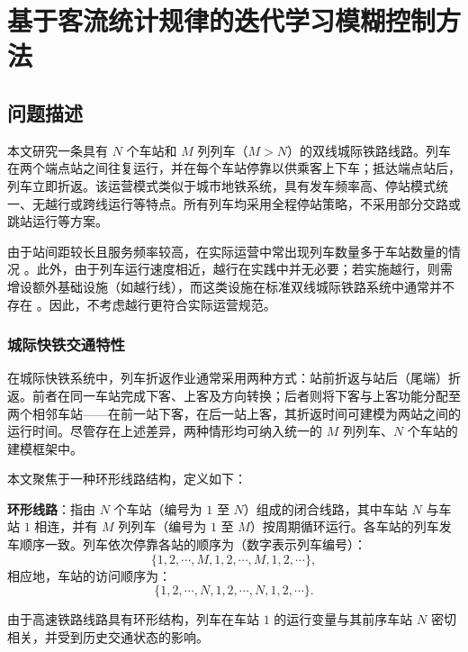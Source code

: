 \chapter{基于客流统计规律的迭代学习模糊控制方法}\label{chap:06}
\setcounter{algorithm}{0} %

\section{问题描述}
\label{section2}

本文研究一条具有 $N$ 个车站和 $M$ 列列车（$M > N$）的双线城际铁路线路。列车在两个端点站之间往复运行，并在每个车站停靠以供乘客上下车；抵达端点站后，列车立即折返。该运营模式类似于城市地铁系统，具有发车频率高、停站模式统一、无越行或跨线运行等特点。所有列车均采用全程停站策略，不采用部分交路或跳站运行等方案。

由于站间距较长且服务频率较高，在实际运营中常出现列车数量多于车站数量的情况 \cite{Kang2024}。此外，由于列车运行速度相近，越行在实践中并无必要；若实施越行，则需增设额外基础设施（如越行线），而这类设施在标准双线城际铁路系统中通常并不存在 \cite{Gupta2016}。因此，不考虑越行更符合实际运营规范。

\subsection{城际快铁交通特性}

在城际快铁系统中，列车折返作业通常采用两种方式：站前折返与站后（尾端）折返。前者在同一车站完成下客、上客及方向转换；后者则将下客与上客功能分配至两个相邻车站——在前一站下客，在后一站上客，其折返时间可建模为两站之间的运行时间。尽管存在上述差异，两种情形均可纳入统一的 $M$ 列列车、$N$ 个车站的建模框架中。

本文聚焦于一种环形线路结构，定义如下：

\textbf{环形线路}：指由 $N$ 个车站（编号为 $1$ 至 $N$）组成的闭合线路，其中车站 $N$ 与车站 $1$ 相连，并有 $M$ 列列车（编号为 $1$ 至 $M$）按周期循环运行。各车站的列车发车顺序一致。列车依次停靠各站的顺序为（数字表示列车编号）：
\begin{equation*}
	\{1,2, \cdots, M, 1,2, \cdots, M, 1,2, \cdots\},
\end{equation*}
相应地，车站的访问顺序为：
\begin{equation*}
	\{1,2, \cdots, N, 1,2, \cdots, N, 1,2, \cdots\}.
\end{equation*}

由于高速铁路线路具有环形结构，列车在车站 $1$ 的运行变量与其前序车站 $N$ 密切相关，并受到历史交通状态的影响。

